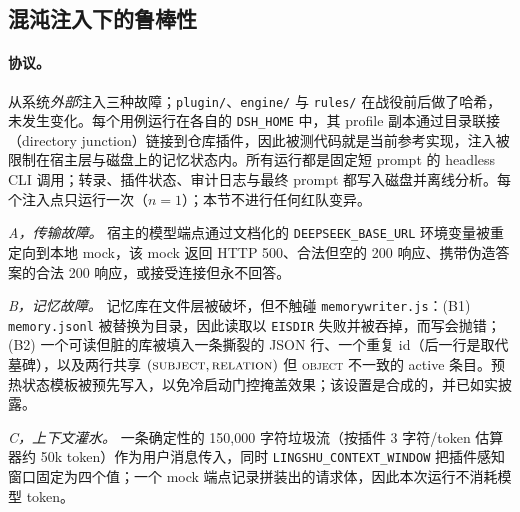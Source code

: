 \subsection{混沌注入下的鲁棒性}

\paragraph{协议。} 从系统\emph{外部}注入三种故障；\texttt{plugin/}、\texttt{engine/} 与 \texttt{rules/} 在战役前后做了哈希，未发生变化。每个用例运行在各自的 \texttt{DSH\_HOME} 中，其 profile 副本通过目录联接（directory junction）链接到仓库插件，因此被测代码就是当前参考实现，注入被限制在宿主层与磁盘上的记忆状态内。所有运行都是固定短 prompt 的 headless CLI 调用；转录、插件状态、审计日志与最终 prompt 都写入磁盘并离线分析。每个注入点只运行一次（$n=1$）；本节不进行任何红队变异。

\emph{A，传输故障。} 宿主的模型端点通过文档化的 \texttt{DEEPSEEK\_\allowbreak{}BASE\_\allowbreak{}URL} 环境变量被重定向到本地 mock，该 mock 返回 HTTP 500、合法但空的 200 响应、携带伪造答案的合法 200 响应，或接受连接但永不回答。

\emph{B，记忆故障。} 记忆库在文件层被破坏，但不触碰 \texttt{memorywriter.js}：(B1) \texttt{memory.jsonl} 被替换为目录，因此读取以 \texttt{EISDIR} 失败并被吞掉，而写会抛错；(B2) 一个可读但脏的库被填入一条撕裂的 JSON 行、一个重复 id（后一行是取代墓碑），以及两行共享 $(\textsc{subject},\textsc{relation})$ 但 \textsc{object} 不一致的 active 条目。预热状态模板被预先写入，以免冷启动门控掩盖效果；该设置是合成的，并已如实披露。

\emph{C，上下文灌水。} 一条确定性的 150{,}000 字符垃圾流（按插件 3 字符/token 估算器约 50k token）作为用户消息传入，同时 \texttt{LINGSHU\_\allowbreak{}CONTEXT\_\allowbreak{}WINDOW} 把插件感知窗口固定为四个值；一个 mock 端点记录拼装出的请求体，因此本次运行不消耗模型 token。

